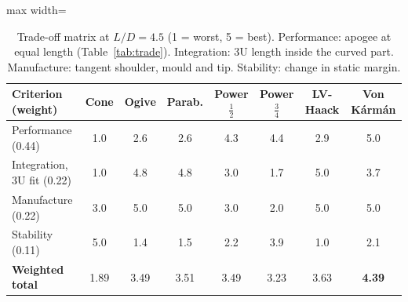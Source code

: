 \begin{table}[H]
\centering
\caption{Trade-off matrix at $L/D = 4.5$ (1 = worst, 5 = best). Performance: apogee at equal length (Table~\ref{tab:trade}). Integration: 3U length inside the curved part. Manufacture: tangent shoulder, mould and tip. Stability: change in static margin.}
\label{tab:matrix}
\small
\begin{adjustbox}{max width=\textwidth}
\begin{tabular}{@{}lccccccc@{}}
\toprule
Criterion (weight) & Cone & Ogive & Parab. & Power $\tfrac12$ & Power $\tfrac34$ & LV-Haack & Von K\'arm\'an \\
\midrule
Performance (0.44) & 1.0 & 2.6 & 2.6 & 4.3 & 4.4 & 2.9 & 5.0 \\
Integration, 3U fit (0.22) & 1.0 & 4.8 & 4.8 & 3.0 & 1.7 & 5.0 & 3.7 \\
Manufacture (0.22) & 3.0 & 5.0 & 5.0 & 3.0 & 2.0 & 5.0 & 5.0 \\
Stability (0.11) & 5.0 & 1.4 & 1.5 & 2.2 & 3.9 & 1.0 & 2.1 \\
\midrule
\textbf{Weighted total} & 1.89 & 3.49 & 3.51 & 3.49 & 3.23 & 3.63 & \textbf{4.39} \\
\bottomrule
\end{tabular}
\end{adjustbox}
\end{table}
